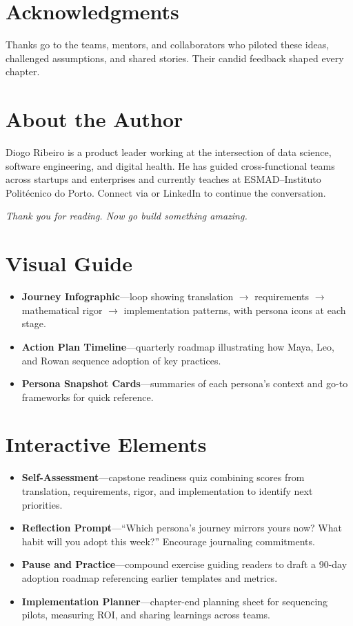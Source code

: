 \section{Acknowledgments}
\label{sec:acknowledgments}

Thanks go to the teams, mentors, and collaborators who piloted these ideas, challenged assumptions, and shared stories. Their candid feedback shaped every chapter.

\section{About the Author}
\label{sec:about-author}

Diogo Ribeiro is a product leader working at the intersection of data science, software engineering, and digital health. He has guided cross-functional teams across startups and enterprises and currently teaches at ESMAD--Instituto Politécnico do Porto. Connect via  or LinkedIn to continue the conversation.

\vspace{1cm}
\begin{center}
\textit{Thank you for reading. Now go build something amazing.}
\end{center}
\section{Visual Guide}
\label{sec:conclusion-visuals}
\begin{itemize}
    \item \textbf{Journey Infographic}—loop showing translation $\rightarrow$ requirements $\rightarrow$ mathematical rigor $\rightarrow$ implementation patterns, with persona icons at each stage.
    \item \textbf{Action Plan Timeline}—quarterly roadmap illustrating how Maya, Leo, and Rowan sequence adoption of key practices.
    \item \textbf{Persona Snapshot Cards}—summaries of each persona’s context and go-to frameworks for quick reference.
\end{itemize}

\section{Interactive Elements}
\label{sec:conclusion-interactive}
\begin{itemize}
    \item \textbf{Self-Assessment}—capstone readiness quiz combining scores from translation, requirements, rigor, and implementation to identify next priorities.
    \item \textbf{Reflection Prompt}—``Which persona’s journey mirrors yours now? What habit will you adopt this week?'' Encourage journaling commitments.
    \item \textbf{Pause and Practice}—compound exercise guiding readers to draft a 90-day adoption roadmap referencing earlier templates and metrics.
    \item \textbf{Implementation Planner}—chapter-end planning sheet for sequencing pilots, measuring ROI, and sharing learnings across teams.
\end{itemize}

